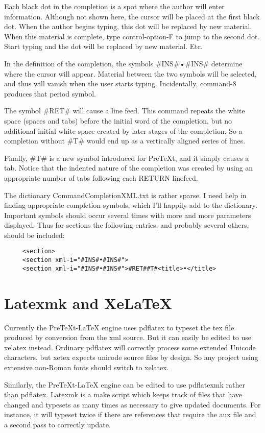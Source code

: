 \documentclass[11pt, oneside]{article}   	%
\begin{document}
Each black dot in the completion is a spot where the author will enter information. Although not shown here, the cursor will be placed at the first black dot. When the author begins typing, this dot will be replaced by new material. When this material is complete,  type control-option-F to jump to the second dot. Start typing and the dot will be replaced by  new material. Etc.

In the definition of the completion, the symbols \#INS\#•\#INS\# determine where the cursor will appear. Material between the two symbols will be selected, and thus will vanish when the user starts typing. Incidentally, command-8 produces that period symbol.

The symbol \#RET\# will cause a line feed. This command repeats the white space (spaces and tabs) before the initial word of the completion, but no additional initial white space created by later stages of the completion.
So a completion without \#T\# would end up as a vertically aligned series of lines.

Finally, \#T\# is a new symbol introduced for PreTeXt, and it simply causes a tab. Notice that the indented nature of the completion was created by using an appropriate number of tabs following each RETURN linefeed.

The dictionary CommandCompletionXML.txt is rather sparse. I need help in finding appropriate completion symbols, which I'll happily add to the dictionary. Important symbols should occur several times with more and more parameters displayed. Thus for sections the following entries, and probably several others, should be included:
\begin{verbatim}
     <section>
     <section xml-i="#INS#•#INS#">
     <section xml-i="#INS#•#INS#">#RET##T#<title>•</title>
\end{verbatim}

\section{Latexmk and XeLaTeX} 

Currently the PreTeXt-LaTeX engine uses pdflatex to typeset the tex file produced by conversion from the xml source. But it can easily be edited to use xelatex instead. Ordinary pdflatex will correctly process some extended Unicode characters, but xetex expects unicode source files by design. So any project using extensive non-Roman fonts should switch to xelatex.

Similarly, the PreTeXt-LaTeX engine can be edited to use pdflatexmk rather than pdflatex. Latexmk is a make script which keeps track of files that have changed and typesets as many times as necessary to give updated documents. For instance, it will typeset twice if there are references that require the aux file and a second pass to correctly update. 
\end{document}
